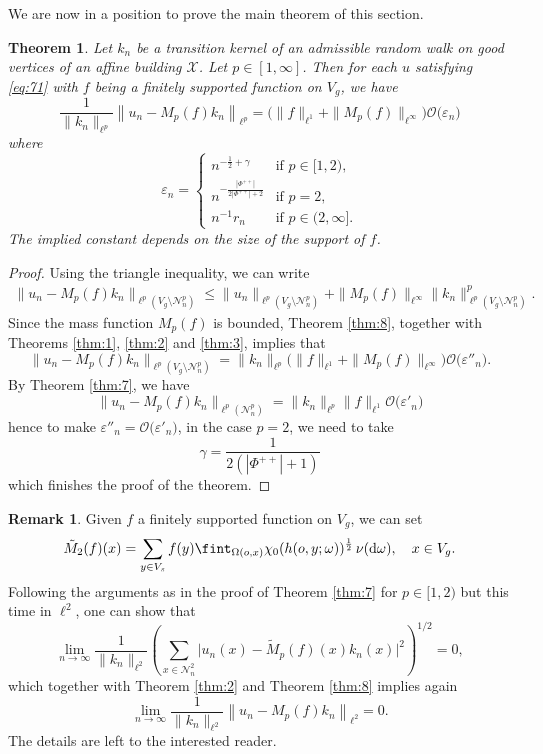 \documentclass[11pt]{amsart}
\newcommand{\calO}{\mathcal{O}}
\newcommand{\scrX}{\mathscr{X}}
\newcommand{\scrN}{\mathscr{N}}
\theoremstyle{plain}
\newcounter{thm}
\newtheorem{theorem}{Theorem}[section]
\theoremstyle{definition}
\newtheorem{remark}{Remark}
\numberwithin{equation}{section}
\begin{document}
We are now in a position to prove the main theorem of this section.
\begin{theorem}
	\label{thm:6}
	Let $k_n$ be a transition kernel of an admissible random walk on good vertices of an affine building $\scrX$.
	Let $p \in [1, \infty]$. Then for each $u$ satisfying \eqref{eq:71} with $f$ being a finitely
    supported function on $V_g$, we have
	\[
		\frac{1}{\|k_n\|_{\ell^p}}
		\left\| u_n - M_p(f) k_n \right\|_{\ell^p}
		=
		\Big(\|f\|_{\ell^1} + \|M_p(f)\|_{\ell^\infty}\Big)
		\calO\big(\varepsilon_n \big)
	\]
	where 
	\[
		\varepsilon_n =
		\begin{cases}
			n^{-\frac{1}{2}+\gamma} &\text{if } p \in [1, 2), \\
			n^{-\frac{|\Phi^{++}|}{2 |\Phi^{++}|+2}} &\text{if } p=2,\\
			n^{-1}r_n &\text{if } p\in (2, \infty].
		\end{cases}
	\]
	The implied constant depends on the size of the support of $f$.
\end{theorem}
\begin{proof}
	Using the triangle inequality, we can write
	\begin{align*}
		\big\|u_n - M_p(f) k_n \big\|_{\ell^p(V_g \setminus \scrN_n^p)}
		\leqslant
		\big\|u_n \big\|_{\ell^p(V_g \setminus \scrN_n^p)}
		+
		\|M_p(f)\|_{\ell^\infty}
		\big\| k_n \big\|_{\ell^p(V_g \setminus \scrN_n^p)}^p.
	\end{align*}
	Since the mass function $M_p(f)$ is bounded, Theorem \ref{thm:8}, together with Theorems \ref{thm:1}, \ref{thm:2} and 
	\ref{thm:3}, implies that
	\[
		\big\|u_n - M_p(f) k_n \big\|_{\ell^p(V_g \setminus \scrN_n^p)}
		=
		\|k_n\|_{\ell^p}
		\big(
		\|f\|_{\ell^1} + \|M_p(f)\|_{\ell^\infty}
		\big)
		\calO\big(\varepsilon''_n \big).
	\]
	By Theorem \ref{thm:7}, we have
	\[
		\big\|u_n-M_p(f) k_n\big\|_{\ell^p(\scrN_n^p)}
		= \|k_n\|_{\ell^p} \|f\|_{\ell^1} \calO\big(\varepsilon'_n)
	\]
	hence to make $\varepsilon''_n = \calO\big(\varepsilon'_n)$, in the case $p = 2$, we need to take
	\[
		\gamma = \frac{1}{2(|\Phi^{++}|+1)}
	\]
	which finishes the proof of the theorem.
\end{proof}

\begin{remark}
	\label{rem:1}
	Given $f$ a finitely supported function on $V_g$, we can set
	\[
		\tilde{M}_2(f)(x) =\sum_{y\in V_s}f(y)\fint_{\Omega(o,x)}\chi_{0}(h(o,y;\omega))^{\frac{1}{2}}\, \nu({\rm d}\omega),
		\quad x \in V_g.
	\]
	Following the arguments as in the proof of Theorem \ref{thm:7} for $p \in [1, 2)$ but this time in $\ell^2$, one can show 
	that 
	\[
		\lim_{n \to \infty}
		\frac{1}{\|k_n\|_{\ell^2}}
		\left(\sum_{x \in \scrN_n^2} \big|u_n(x) - \tilde{M}_p(f)(x) k_n(x)\big|^2\right)^{1/2}
		=0,
	\]
	which together with Theorem \ref{thm:2} and Theorem \ref{thm:8} implies again
	\[
		\lim_{n \to \infty}
		\frac{1}{\|k_n\|_{\ell^2}}
		\left\| u_n - M_p(f) k_n \right\|_{\ell^2} = 0.
	\]
	The details are left to the interested reader.
\end{remark}
\end{document}
